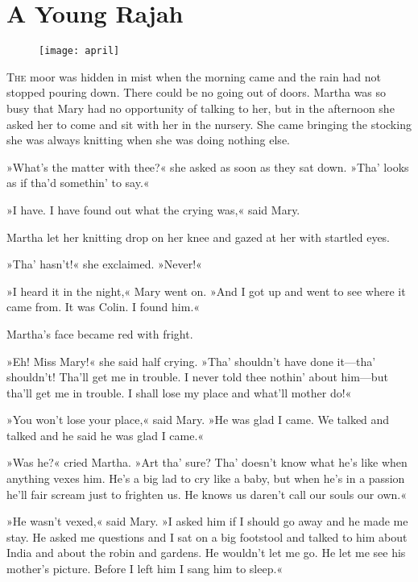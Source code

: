 \chapter{A Young Rajah} 
	
\begin{figure}[t!]
\centering
\texttt{[image: april]}
\end{figure}

	\lettrine[lines=6]{T}{he} moor was hidden in mist when the morning came and the rain had not stopped pouring down. There could be no going out of doors. Martha was so busy that Mary had no opportunity of talking to her, but in the afternoon she asked her to come and sit with her in the nursery. She came bringing the stocking she was always knitting when she was doing nothing else.

\zz
»What's the matter with thee?« she asked as soon as they sat down. »Tha' looks as if tha'd somethin' to say.«

»I have. I have found out what the crying was,« said Mary.

Martha let her knitting drop on her knee and gazed at her with startled eyes.

»Tha' hasn't!« she exclaimed. »Never!«

»I heard it in the night,« Mary went on. »And I got up and went to see where it came from. It was Colin. I found him.«

Martha's face became red with fright.

»Eh! Miss Mary!« she said half crying. »Tha' shouldn't have done it—tha' shouldn't! Tha'll get me in trouble. I never told thee nothin' about him—but tha'll get me in trouble. I shall lose my place and what'll mother do!«

»You won't lose your place,« said Mary. »He was glad I came. We talked and talked and he said he was glad I came.«

»Was he?« cried Martha. »Art tha' sure? Tha' doesn't know what he's like when anything vexes him. He's a big lad to cry like a baby, but when he's in a passion he'll fair scream just to frighten us. He knows us daren't call our souls our own.«

»He wasn't vexed,« said Mary. »I asked him if I should go away and he made me stay. He asked me questions and I sat on a big footstool and talked to him about India and about the robin and gardens. He wouldn't let me go. He let me see his mother's picture. Before I left him I sang him to sleep.«

